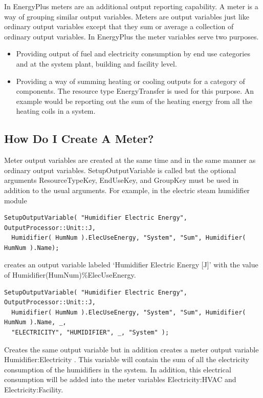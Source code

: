In EnergyPlus meters are an additional output reporting capability. A meter is a way of grouping similar output variables. Meters are output variables just like ordinary output variables except that they sum or average a collection of ordinary output variables. In EnergyPlus the meter variables serve two purposes.

\begin{itemize}
\item
  Providing output of fuel and electricity consumption by end use categories and at the system plant, building and facility level.
\item
  Providing a way of summing heating or cooling outputs for a category of components. The resource type EnergyTransfer is used for this purpose. An example would be reporting out the sum of the heating energy from all the heating coils in a system.
\end{itemize}

\subsection{How Do I Create A Meter?}\label{how-do-i-create-a-meter}

Meter output variables are created at the same time and in the same manner as ordinary output variables. SetupOutputVariable is called but the optional arguments ResourceTypeKey, EndUseKey, and GroupKey must be used in addition to the usual arguments. For example, in the electric steam humidifier module

\begin{lstlisting}
SetupOutputVariable( "Humidifier Electric Energy", OutputProcessor::Unit::J,
  Humidifier( HumNum ).ElecUseEnergy, "System", "Sum", Humidifier( HumNum ).Name);

\end{lstlisting}

creates an output variable labeled `Humidifier Electric Energy {[}J{]}' with the value of Humidifier(HumNum)\%ElecUseEnergy.

\begin{lstlisting}
SetupOutputVariable( "Humidifier Electric Energy", OutputProcessor::Unit::J,
  Humidifier( HumNum ).ElecUseEnergy, "System", "Sum", Humidifier( HumNum ).Name, _,
  "ELECTRICITY", "HUMIDIFIER", _, "System" );

\end{lstlisting}


Creates the same output variable but in addition creates a meter output variable Humidifier:Electricity . This variable will contain the sum of all the electricity consumption of the humidifiers in the system. In addition, this electrical consumption will be added into the meter variables Electricity:HVAC and Electricity:Facility.

